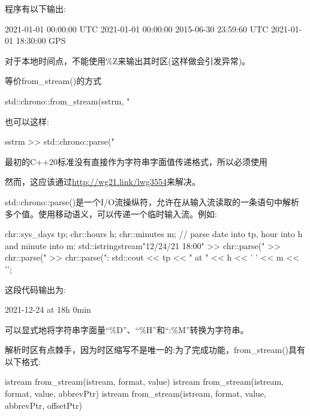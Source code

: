 程序有以下输出:

\begin{shell}
2021-01-01 00:00:00 UTC
2021-01-01 00:00:00
2015-06-30 23:59:60 UTC
2021-01-01 18:30:00 GPS
\end{shell}

对于本地时间点，不能使用\%Z来输出其时区(这样做会引发异常)。


等价from\_stream()的方式

\begin{cpp}
std::chrono::from_stream(sstrm, "%
\end{cpp}

也可以这样:

\begin{cpp}
sstrm >> std::chrono::parse("%
\end{cpp}

最初的C++20标准没有直接作为字符串字面值传递格式，所以必须使用


然而，这应该通过\url{http://wg21.link/lwg3554}来解决。

std::chrono::parse()是一个I/O流操纵符，允许在从输入流读取的一条语句中解析多个值。使用移动语义，可以传递一个临时输入流。例如:
\begin{cpp}
chr::sys_days tp;
chr::hours h;
chr::minutes m;
// parse date into tp, hour into h and minute into m:
std::istringstream{"12/24/21 18:00"} >> chr::parse("%
									 >> chr::parse(" %
									 >> chr::parse(":%
std::cout << tp << " at " << h << ' ' << m << '\n';
\end{cpp}

这段代码输出为:

\begin{shell}
2021-12-24 at 18h 0min
\end{shell}

可以显式地将字符串字面量“\%D”、“\%H”和“:\%M”转换为字符串。


解析时区有点棘手，因为时区缩写不是唯一的:为了完成功能，from\_stream()具有以下格式:

\begin{shell}
istream from_stream(istream, format, value)
istream from_stream(istream, format, value, abbrevPtr)
istream from_stream(istream, format, value, abbrevPtr, offsetPtr)
\end{shell}

